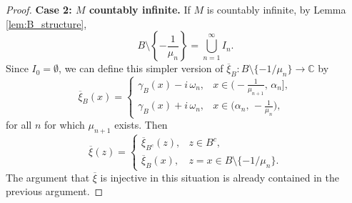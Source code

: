 \documentclass[10pt,a4paper]{amsart}
\numberwithin{equation}{section}
\begin{document}
\begin{proof}
\noindent\textbf{Case 2: $M$ countably infinite.}
If $M$ is countably infinite, by Lemma \ref{lem:B_structure},
 $$
 B\setminus \left\{-\frac{1} {\mu_n}\right\} = \bigcup_{n=1}^\infty I_n.
 $$
Since $I_0 = \emptyset$, we can define this simpler version of $\overline{\xi}_B:B\setminus\{-1/\mu_n\}\to\mathbb{C}$ by
\begin{equation}
 \overline{\xi}_B(x)=
 \begin{cases}
 \gamma_B(x)- i\,\omega_n, & x\in\big(-\tfrac{1}{\mu_{n+1}},\,\alpha_n\big],\\[2pt]
 \gamma_B(x)+ i\,\omega_n, & x\in\big(\alpha_n,\,-\tfrac{1}{\mu_n}\big),
 \end{cases}
\end{equation}
for all $n$ for which $\mu_{n+1}$ exists. Then
 \[
 \overline{\xi}(z)=
 \begin{cases}
 \overline{\xi}_{B^c}(z), & z\in B^c,\\[2pt]
 \overline{\xi}_B(x), & z=x\in B\setminus\{-1/\mu_n\}.
 \end{cases}
\]
The argument that $\overline{\xi}$ is injective in this situation is already contained in
the previous argument.
\end{proof}
\end{document}

